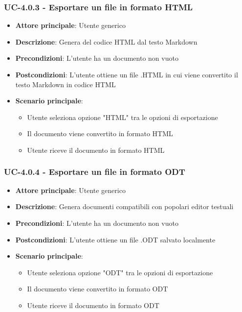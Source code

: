 \documentclass[11pt,a4paper]{article}
\begin{document}
\subsubsection{UC-4.0.3 - Esportare un file in formato HTML}
\begin{itemize}
    \item \textbf{Attore principale}: Utente generico
    \item \textbf{Descrizione}: Genera del codice HTML dal testo Markdown
    \item \textbf{Precondizioni}: L'utente ha un documento non vuoto
    \item \textbf{Postcondizioni}: L'utente ottiene un file .HTML in cui viene convertito il testo Markdown in codice HTML
    \item \textbf{Scenario principale}:
        \begin{itemize}
            \item Utente seleziona opzione "HTML" tra le opzioni di esportazione
            \item Il documento viene convertito in formato HTML
            \item Utente riceve il documento in formato HTML
        \end{itemize}
\end{itemize}

\subsubsection{UC-4.0.4 - Esportare un file in formato ODT}
\begin{itemize}
    \item \textbf{Attore principale}: Utente generico
    \item \textbf{Descrizione}: Genera documenti compatibili con popolari editor testuali
    \item \textbf{Precondizioni}: L'utente ha un documento non vuoto
    \item \textbf{Postcondizioni}: L'utente ottiene un file .ODT salvato localmente
    \item \textbf{Scenario principale}:
        \begin{itemize}
            \item Utente seleziona opzione "ODT" tra le opzioni di esportazione
            \item Il documento viene convertito in formato ODT
            \item Utente riceve il documento in formato ODT
        \end{itemize}
\end{itemize}
\end{document}
